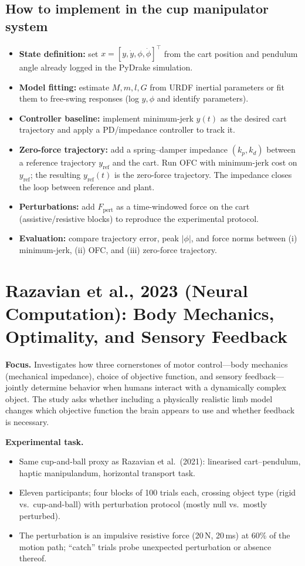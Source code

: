 \documentclass[11pt]{article}
\begin{document}
\subsection*{How to implement in the cup manipulator system}
\begin{itemize}[leftmargin=1.2em]
  \item \textbf{State definition:} set $x=[y,\dot{y},\phi,\dot{\phi}]^\top$ from the cart position and pendulum angle already logged in the PyDrake simulation.
  \item \textbf{Model fitting:} estimate $M,m,l,G$ from URDF inertial parameters or fit them to free-swing responses (log $y,\phi$ and identify parameters).
  \item \textbf{Controller baseline:} implement minimum-jerk $y(t)$ as the desired cart trajectory and apply a PD/impedance controller to track it.
  \item \textbf{Zero-force trajectory:} add a spring--damper impedance $(k_p,k_d)$ between a reference trajectory $y_{\text{ref}}$ and the cart.  Run OFC with minimum-jerk cost on $y_{\text{ref}}$; the resulting $y_{\text{ref}}(t)$ is the zero-force trajectory.  The impedance closes the loop between reference and plant.
  \item \textbf{Perturbations:} add $F_{\text{pert}}$ as a time-windowed force on the cart (assistive/resistive blocks) to reproduce the experimental protocol.
  \item \textbf{Evaluation:} compare trajectory error, peak $|\phi|$, and force norms between (i) minimum-jerk, (ii) OFC, and (iii) zero-force trajectory.
\end{itemize}

\section{Razavian et al., 2023 (Neural Computation): Body Mechanics, Optimality, and Sensory Feedback}
\textbf{Focus.} Investigates how three cornerstones of motor control---body mechanics (mechanical impedance), choice of objective function, and sensory feedback---jointly determine behavior when humans interact with a dynamically complex object.  The study asks whether including a physically realistic limb model changes which objective function the brain appears to use and whether feedback is necessary.

\textbf{Experimental task.}
\begin{itemize}[leftmargin=1.2em]
  \item Same cup-and-ball proxy as Razavian et al.\ (2021): linearised cart--pendulum, haptic manipulandum, horizontal transport task.
  \item Eleven participants; four blocks of 100 trials each, crossing object type (rigid vs.\ cup-and-ball) with perturbation protocol (mostly null vs.\ mostly perturbed).
  \item The perturbation is an impulsive resistive force (20\,N, 20\,ms) at 60\% of the motion path; ``catch'' trials probe unexpected perturbation or absence thereof.
\end{itemize}
\end{document}
